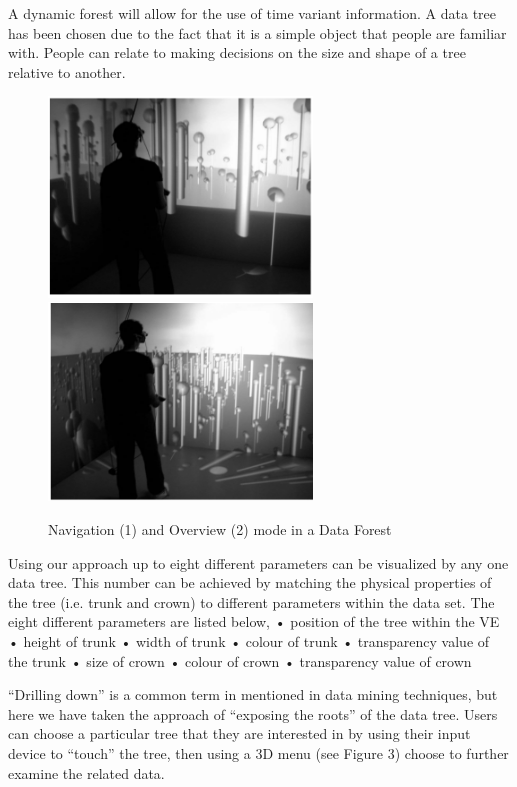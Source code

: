 A dynamic forest will allow for the use of time variant information. A data tree has been chosen due to the fact that it is a simple object that people are familiar with. People can relate to making decisions on the size and shape of a tree relative to another.
\cite{Jamieson2007}

\begin{figure}[h]
	\begin{center}
		\includegraphics[width=7cm]{03_Figures/05_LitReview/Jamieson2007_DataTree.png}
		\includegraphics[width=7cm]{03_Figures/05_LitReview/Jamieson2007_DataTreeOverview.png}
		\caption[Navigation and Overview mode in a Data Forest]{Navigation (1) and Overview (2) mode in a Data Forest \citep{Jamieson2007}}
		\label{fig:datatrees}
	\end{center}
\end{figure} 

Using our approach up to eight different parameters can be visualized by any one data tree. This number can be achieved by matching the physical properties of the tree (i.e. trunk and crown) to different parameters within the data set. The eight different parameters are listed below,
• position of the tree within the VE • height of trunk • width of trunk • colour of trunk • transparency value of the trunk • size of crown • colour of crown • transparency value of crown
\cite{Jamieson2007}

“Drilling down” is a common term in mentioned in data mining techniques, but here we have taken the approach of “exposing the roots” of the data tree. Users can choose a particular tree that they are interested in by using their input device to “touch” the tree, then using a 3D menu (see Figure 3) choose to further examine the related data.
\cite{Jamieson2007}

